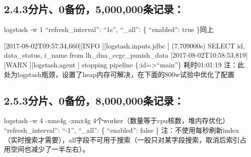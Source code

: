 \documentclass{article}
\begin{document}
\subsection{2.4.\hspace*{0.5em}3分片、0备份，5,000,000条记录：}\label{sec-305000000}%

\noindent{}logstash -w 1
\textquotedblleft{}refresh\_interval\textquotedblright{}: \textquotedblleft{}1s\textquotedblright{}, \textquotedblleft{}\_all\textquotedblright{}: \{ \textquotedblleft{}enabled\textquotedblright{}: true \}同上         %

[2017-08-02T09:57:34,660][INFO ][logstash.inputs.jdbc     ] (7.709000s) SELECT id, data\_status, i\_name from lh\_dna\_ccgc\_punish\_data             \mdbr
{}[2017-08-02T10:58:53,819][WARN ][logstash.agent           ] stopping pipeline \{:id=\textgreater{}\textquotedblleft{}main\textquotedblright{}\}             \mdbr
{}耗时01:01:19          \mdbr
{}注：此处为logstash瓶颈，设置了heap内存可解决，在下面的800w试验中优化了配置              %

\subsection{2.5.\hspace*{0.5em}3分片、0备份，8,000,000条记录：}\label{sec-308000000}%

\noindent{}logstash -w 4 -xms4g -xmx4g 4个worker（数量等于cpu核数，堆内存优化）             \mdbr
{}\textquotedblleft{}refresh\_interval\textquotedblright{}: \textquotedblleft{}-1\textquotedblright{}, \textquotedblleft{}\_all\textquotedblright{}: \{ \textquotedblleft{}enabled\textquotedblright{}: false \}              \mdbr
{}注：不使用每秒刷新index（实时搜索才需要），all字段不可用于搜索（一般只对某字段搜索，取消后索引占用空间也减少了一半左右）。              %
\end{document}
